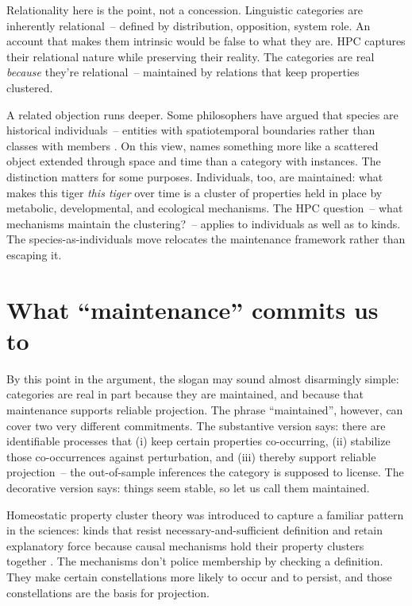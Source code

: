 Relationality here is the point, not a concession. Linguistic categories are inherently relational~-- defined by distribution, opposition, system role. An account that makes them intrinsic would be false to what they are. HPC captures their relational nature while preserving their reality. The categories are real \emph{because} they're relational~-- maintained by relations that keep properties clustered.

A related objection runs deeper. Some philosophers have argued that species are historical individuals~-- entities with spatiotemporal boundaries rather than classes with members \citep{ghiselin1974,hull1978}. On this view,  names something more like a scattered object extended through space and time than a category with instances. The distinction matters for some purposes. Individuals, too, are maintained: what makes this tiger \emph{this tiger} over time is a cluster of properties held in place by metabolic, developmental, and ecological mechanisms. The HPC question~-- what mechanisms maintain the clustering?~-- applies to individuals as well as to kinds. The species-as-individuals move relocates the maintenance framework rather than escaping it.


\section{What \enquote{maintenance} commits us to}
\label{sec:4:maintenance-commitments}

By this point in the argument, the slogan may sound almost disarmingly simple: categories are real in part because they are maintained, and because that maintenance supports reliable projection. The phrase \enquote{maintained}, however, can cover two very different commitments. The substantive version says: there are identifiable processes that (i) keep certain properties co-occurring, (ii) stabilize those co-occurrences against perturbation, and (iii) thereby support reliable projection~-- the out-of-sample inferences the category is supposed to license. The decorative version says: things seem stable, so let us call them maintained.

Homeostatic property cluster theory was introduced to capture a familiar pattern in the sciences: kinds that resist necessary-and-sufficient definition and retain explanatory force because causal mechanisms hold their property clusters together \citep{boyd1991,boyd1999}. The mechanisms don't police membership by checking a definition. They make certain constellations more likely to occur and to persist, and those constellations are the basis for projection.

